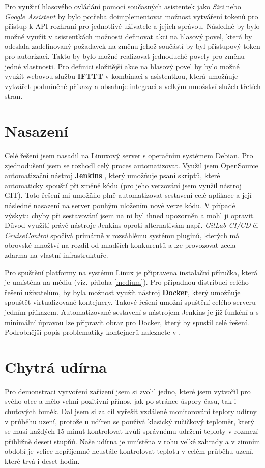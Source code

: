 Pro využití hlasového ovládání pomocí současných asistentek jako \textit{Siri} nebo \textit{Google Assistent} by bylo potřeba doimplementovat možnost vytváření tokenů pro přístup k API rozhraní pro jednotlivé uživatele a jejich správou. Následně by bylo možné využít v asistentkách možnosti definovat akci na hlasový povel, která by odeslala zadefinovaný požadavek na změnu jehož součástí by byl přístupový token pro autorizaci. Takto by bylo možné realizovat jednoduché povely pro změnu jedné vlastnosti. Pro definici složitější akce na hlasový povel by bylo možné využít webovou službu \textbf{IFTTT} \cite{ifttt} v kombinaci s asistentkou, která umožňuje vytvářet podmíněné příkazy a obsahuje integraci s velkým množství služeb třetích stran.


\section{Nasazení}
Celé řešení jsem nasadil na Linuxový server s operačním systémem Debian. Pro zjednodušení jsem se rozhodl celý proces automatizovat. Využil jsem OpenSource automatizační nástroj \textbf{Jenkins} \cite{jenkins}, který umožňuje psaní skriptů, které automaticky spouští při změně kódu (pro jeho verzování jsem využil nástroj GIT). Toto řešení mi umožňilo plně automatizovat sestavení celé aplikace a její následné nasazení na server pouhým uložením nové verze kódu. V případě výskytu chyby při sestavování jsem na ni byl ihned upozorněn a mohl ji opravit. Důvod využití právě nástroje Jenkins oproti alternativám např. \textit{GitLab CI/CD} či \textit{CruiseControl} spočívá primárně v rozsáhlému systému pluginů, kterých má obrovské množtví na rozdíl od mladších konkurentů a lze provozovat zcela zdarma na vlastní infrastruktuře.

Pro spuštění platformy na systému Linux je připravena instalační příručka, která je umístěna na médiu (viz. příloha \ref{medium}). Pro případnou distribuci celého řešení uživatelům, by byla možnost využít nástroj \textbf{Docker}, který umožňuje spouštět virtualizované kontejnery. Takové řešení umožní spuštění celého serveru jedním příkazem. Automatizované sestavení s nástrojem Jenkins je již funkční a s minimální úpravou lze připravit obraz pro Docker, který by spustil celé řešení. Podrobnější popis problematiky kontejnerů naleznete v \cite{containers}.



\section{Chytrá udírna} %
Pro demonstraci vytvoření zařízení jsem si zvolil jedno, které jsem vytvořil pro svého otce a mělo velmi pozitivní přínos, jak po stránce úspory času, tak i chuťových buněk. Dal jsem si za cíl vyřešit vzdálené monitorování teploty udírny v průběhu uzení, protože u udíren se používá klasický ručičkový teploměr, který se musí každých 15 minut kontrolovat kvůli správnému udržení teploty v rozmezí přibližně deseti stupňů. Naše udírna je umístěna v rohu velké zahrady a v zimním období je velice nepříjemné neustále kontrolovat teplotu v celém průběhu uzení, které trvá i deset hodin.

